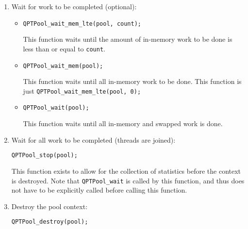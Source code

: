 \begin{enumerate}
\item Wait for work to be completed (optional):

  \begin{itemize}
    \item \texttt{QPTPool\_wait\_mem\_lte(pool, count);}

      This function waits until the amount of in-memory work to be
      done is less than or equal to \texttt{count}.

    \item \texttt{QPTPool\_wait\_mem(pool);}

      This function waits until all in-memory work to be done. This
      function is just \texttt{QPTPool\_wait\_mem\_lte(pool, 0);}

    \item \texttt{QPTPool\_wait(pool);}

      This function waits until all in-memory and swapped work is done.
  \end{itemize}

\item Wait for all work to be completed (threads are joined):

  \texttt{QPTPool\_stop(pool);}

  This function exists to allow for the collection of statistics
  before the context is destroyed. Note that \texttt{QPTPool\_wait} is
  called by this function, and thus does not have to be explicitly
  called before calling this function.

\item Destroy the pool context:

  \texttt{QPTPool\_destroy(pool);}
\end{enumerate}

